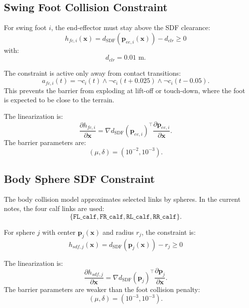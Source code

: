 \documentclass[11pt,a4paper]{article}
\begin{document}
\subsection{Swing Foot Collision Constraint}

For swing foot $i$, the end-effector must stay above the SDF clearance:
\begin{equation}
	\boxed{
		h_{fc,i}(\bm{x})
		=
		d_{\text{SDF}}
		(\bm{p}_{ee,i}(\bm{x}))
		-
		d_{clr}
		\geq
		0
	}
\end{equation}
with:
\begin{equation}
	d_{clr}=0.01\text{ m}.
\end{equation}

The constraint is active only away from contact transitions:
\begin{equation}
	a_{fc,i}(t)
	=
	\neg c_i(t)
	\land
	\neg c_i(t+0.025)
	\land
	\neg c_i(t-0.05).
\end{equation}
This prevents the barrier from exploding at lift-off or touch-down, where the foot is expected to be close to the terrain.

The linearization is:
\begin{equation}
	\frac{\partial h_{fc,i}}{\partial \bm{x}}
	=
	\nabla d_{\text{SDF}}(\bm{p}_{ee,i})^{\top}
	\frac{\partial \bm{p}_{ee,i}}{\partial \bm{x}}.
\end{equation}
The barrier parameters are:
\begin{equation}
	(\mu,\delta)=(10^{-2},10^{-3}).
\end{equation}

\subsection{Body Sphere SDF Constraint}

The body collision model approximates selected links by spheres. In the current notes, the four calf links are used:
\begin{equation}
	\{\texttt{FL\_calf},\texttt{FR\_calf},\texttt{RL\_calf},\texttt{RR\_calf}\}.
\end{equation}

For sphere $j$ with center $\bm{p}_j(\bm{x})$ and radius $r_j$, the constraint is:
\begin{equation}
	\boxed{
		h_{sdf,j}(\bm{x})
		=
		d_{\text{SDF}}(\bm{p}_j(\bm{x}))
		-
		r_j
		\geq
		0
	}
\end{equation}

The linearization is:
\begin{equation}
	\frac{\partial h_{sdf,j}}{\partial \bm{x}}
	=
	\nabla d_{\text{SDF}}(\bm{p}_j)^{\top}
	\frac{\partial \bm{p}_j}{\partial \bm{x}}.
\end{equation}
The barrier parameters are weaker than the foot collision penalty:
\begin{equation}
	(\mu,\delta)=(10^{-3},10^{-3}).
\end{equation}
\end{document}
